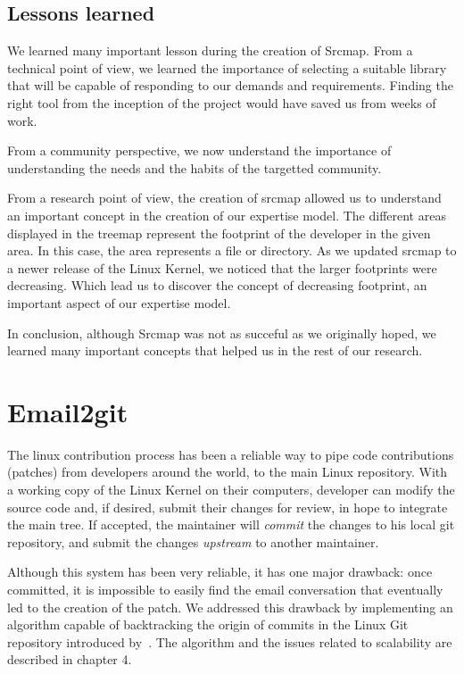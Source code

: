 \subsection{Lessons learned}
\label{sec:lessons_srcmap}

We learned many important lesson during the creation of Srcmap. From a technical point of view, we learned the importance of selecting a suitable library that will be capable of responding to our demands and requirements. Finding the right tool from the inception of the project would have saved us from weeks of work. 

From a community perspective, we now understand the importance of understanding the needs and the habits of the targetted community. 


From a research point of view, the creation of srcmap allowed us to understand an important concept in the creation of our expertise model. The different areas displayed in the treemap represent the footprint of the developer in the given area. In this case, the area represents a file or directory. As we updated srcmap to a newer release of the Linux Kernel, we noticed that the larger footprints were decreasing. Which lead us to discover the concept of decreasing footprint, an important aspect of our expertise model. 


In conclusion, although Srcmap was not as succeful as we originally hoped, we learned many important concepts that helped us in the rest of our research. 


\section{Email2git}
\label{sec:email2git}

The linux contribution process has been a reliable way to pipe code contributions (patches) from developers around the world, to the main Linux repository. With a working copy of the Linux Kernel on their computers, developer can modify the source code and, if desired, submit their changes for review, in hope to integrate the main tree. If accepted, the maintainer will \textit{commit} the changes to his local git repository, and submit the changes \textit{upstream} to another maintainer. 

Although this system has been very reliable, it has one major drawback: once committed, it is impossible to easily find the email conversation that eventually led to the creation of the patch. We addressed this drawback by implementing an algorithm capable of backtracking the origin of commits in the Linux Git repository introduced by~\citep{jiang14}. The algorithm and the issues related to scalability are described in chapter 4.

